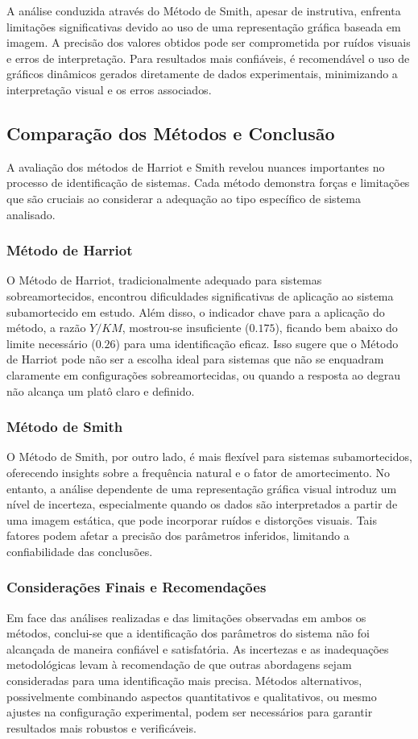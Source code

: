 A análise conduzida através do Método de Smith, apesar de instrutiva, enfrenta limitações significativas devido ao uso de uma representação gráfica baseada em imagem. A precisão dos valores obtidos pode ser comprometida por ruídos visuais e erros de interpretação. Para resultados mais confiáveis, é recomendável o uso de gráficos dinâmicos gerados diretamente de dados experimentais, minimizando a interpretação visual e os erros associados.


\subsection{Comparação dos Métodos e Conclusão}

A avaliação dos métodos de Harriot e Smith revelou nuances importantes no processo de identificação de sistemas. Cada método demonstra forças e limitações que são cruciais ao considerar a adequação ao tipo específico de sistema analisado.

\subsubsection{Método de Harriot}
O Método de Harriot, tradicionalmente adequado para sistemas sobreamortecidos, encontrou dificuldades significativas de aplicação ao sistema subamortecido em estudo. Além disso, o indicador chave para a aplicação do método, a razão \(Y/KM\), mostrou-se insuficiente (\(0.175\)), ficando bem abaixo do limite necessário (\(0.26\)) para uma identificação eficaz. Isso sugere que o Método de Harriot pode não ser a escolha ideal para sistemas que não se enquadram claramente em configurações sobreamortecidas, ou quando a resposta ao degrau não alcança um platô claro e definido.

\subsubsection{Método de Smith}
O Método de Smith, por outro lado, é mais flexível para sistemas subamortecidos, oferecendo insights sobre a frequência natural e o fator de amortecimento. No entanto, a análise dependente de uma representação gráfica visual introduz um nível de incerteza, especialmente quando os dados são interpretados a partir de uma imagem estática, que pode incorporar ruídos e distorções visuais. Tais fatores podem afetar a precisão dos parâmetros inferidos, limitando a confiabilidade das conclusões.

\subsubsection{Considerações Finais e Recomendações}
Em face das análises realizadas e das limitações observadas em ambos os métodos, conclui-se que a identificação dos parâmetros do sistema não foi alcançada de maneira confiável e satisfatória. As incertezas e as inadequações metodológicas levam à recomendação de que outras abordagens sejam consideradas para uma identificação mais precisa. Métodos alternativos, possivelmente combinando aspectos quantitativos e qualitativos, ou mesmo ajustes na configuração experimental, podem ser necessários para garantir resultados mais robustos e verificáveis.

